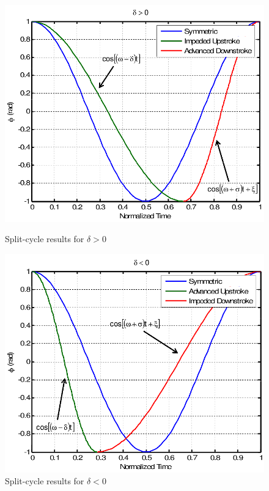 \begin{figure}
\centering
{}
\includegraphics[width=\textwidth]{Files/Figures/deltaPlus.png}
\caption[Split-cycle results for $\delta > 0$]{Split-cycle results for $\delta > 0$}
\label{fig_deltaPlus}
\endminipage\hfill
{}
\includegraphics[width=\textwidth]{Files/Figures/deltaMinus.png}
\caption[Split-cycle results for $\delta < 0$]{Split-cycle results for $\delta < 0$}
\label{fig_deltaMinus}
\endminipage\hfill
\end{figure}


